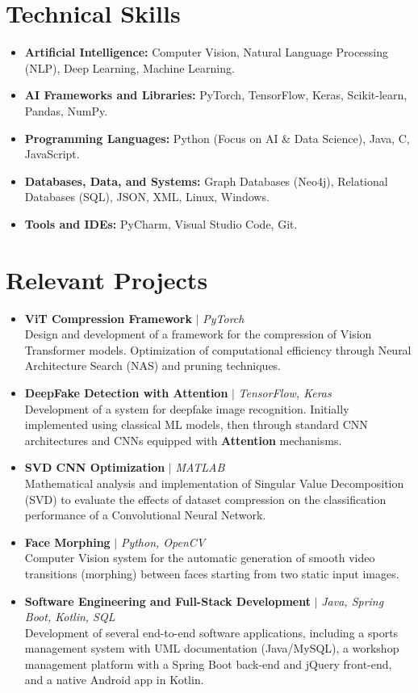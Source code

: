 \documentclass[11pt, a4paper]{article}
\begin{document}
\section{Technical Skills}
\begin{itemize}
    \item \textbf{Artificial Intelligence:} Computer Vision, Natural Language Processing (NLP), Deep Learning, Machine Learning.
    \item \textbf{AI Frameworks and Libraries:} PyTorch, TensorFlow, Keras, Scikit-learn, Pandas, NumPy.
    \item \textbf{Programming Languages:} Python (Focus on AI \& Data Science), Java, C, JavaScript.
    \item \textbf{Databases, Data, and Systems:} Graph Databases (Neo4j), Relational Databases (SQL), JSON, XML, Linux, Windows.
    \item \textbf{Tools and IDEs:} PyCharm, Visual Studio Code, Git.
\end{itemize}

\section{Relevant Projects}
\begin{itemize}
    \item \textbf{ViT Compression Framework} $|$ \textit{PyTorch} \\
    Design and development of a framework for the compression of Vision Transformer models. Optimization of computational efficiency through Neural Architecture Search (NAS) and pruning techniques.

    \item \textbf{DeepFake Detection with Attention} $|$ \textit{TensorFlow, Keras} \\
    Development of a system for deepfake image recognition. Initially implemented using classical ML models, then through standard CNN architectures and CNNs equipped with \textbf{Attention} mechanisms.

    \item \textbf{SVD CNN Optimization} $|$ \textit{MATLAB} \\
    Mathematical analysis and implementation of Singular Value Decomposition (SVD) to evaluate the effects of dataset compression on the classification performance of a Convolutional Neural Network.

    \item \textbf{Face Morphing} $|$ \textit{Python, OpenCV} \\
    Computer Vision system for the automatic generation of smooth video transitions (morphing) between faces starting from two static input images.

    \item \textbf{Software Engineering and Full-Stack Development} $|$ \textit{Java, Spring Boot, Kotlin, SQL} \\
    Development of several end-to-end software applications, including a sports management system with UML documentation (Java/MySQL), a workshop management platform with a Spring Boot back-end and jQuery front-end, and a native Android app in Kotlin.
\end{itemize}
\end{document}
